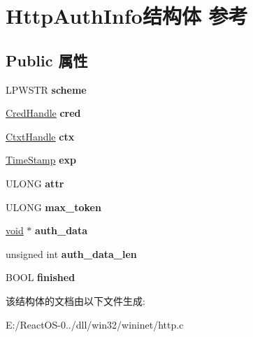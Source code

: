 \hypertarget{struct_http_auth_info}{}\section{Http\+Auth\+Info结构体 参考}
\label{struct_http_auth_info}
\subsection*{Public 属性}
\begin{DoxyCompactItemize}
\item 
\mbox{\label{struct_http_auth_info_ad400a5a6be3dcd7d23ce1edc0e48e28e}} 
L\+P\+W\+S\+TR {\bfseries scheme}
\item 
\mbox{\label{struct_http_auth_info_aff11e68212ff4c822778f57ca13ea3bc}} 
\hyperlink{struct___sec_handle}{Cred\+Handle} {\bfseries cred}
\item 
\mbox{\label{struct_http_auth_info_adf56c780c0ab0593898ba1203db453b7}} 
\hyperlink{struct___sec_handle}{Ctxt\+Handle} {\bfseries ctx}
\item 
\mbox{\label{struct_http_auth_info_a6e429e57263e9b77b05ee785b316163c}} 
\hyperlink{struct___s_e_c_u_r_i_t_y___i_n_t_e_g_e_r}{Time\+Stamp} {\bfseries exp}
\item 
\mbox{\label{struct_http_auth_info_a9bdeb407a4ce16c80795450a3191a004}} 
U\+L\+O\+NG {\bfseries attr}
\item 
\mbox{\label{struct_http_auth_info_a003d254bf5fe541a9ec873814ccb6eba}} 
U\+L\+O\+NG {\bfseries max\+\_\+token}
\item 
\mbox{\label{struct_http_auth_info_a539071f99ddeda6f74e65a759a0232a2}} 
\hyperlink{interfacevoid}{void} $\ast$ {\bfseries auth\+\_\+data}
\item 
\mbox{\label{struct_http_auth_info_acc15426aca4d6acf83d80256106be7c4}} 
unsigned int {\bfseries auth\+\_\+data\+\_\+len}
\item 
\mbox{\label{struct_http_auth_info_af7c9406d2fa4f52f84e343ae567648f0}} 
B\+O\+OL {\bfseries finished}
\end{DoxyCompactItemize}


该结构体的文档由以下文件生成\+:\begin{DoxyCompactItemize}
\item 
E\+:/\+React\+O\+S-\/0../dll/win32/wininet/http.\+c\end{DoxyCompactItemize}
